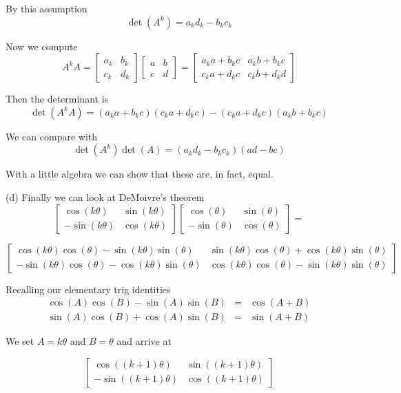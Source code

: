 \documentclass[16 pt]{amsart}
\theoremstyle{definition}
\theoremstyle{remark}
\numberwithin{equation}{subsection}
\begin{document}
By this assumption 
\[
\det(A^k) = a_k d_k - b_k c_k 
\]

Now we compute
\[
A^k A = \begin{bmatrix}
a_k & b_k \\ c_k & d_k
\end{bmatrix}
\begin{bmatrix}
a & b \\ c & d
\end{bmatrix} = 
\begin{bmatrix}
a_k a + b_k c & a_k b + b_k c \\ c_k a + d_k c & c_k  b + d_k d
\end{bmatrix}
\]


Then the determinant is
\[
\det(A^k A) = (a_k a + b_kc)(c_k a + d_k c) - (c_k a + d_k c)(a_k b + b_k c)
\]

We can compare with
\[
\det(A^k)\det(A) = (a_k d_k - b_k c_k)(ad -bc)
\]


With a little algebra we can show that these are, in fact, equal.

\vspace{.25in}

(d) Finally we can look at DeMoivre's theorem
\[
\begin{bmatrix}
\cos(k\theta) & \sin(k\theta) \\ -\sin(k\theta) & \cos(k\theta)
\end{bmatrix}
\begin{bmatrix}
\cos(\theta) & \sin(\theta) \\ -\sin(\theta) & \cos(\theta)
\end{bmatrix} = 
\]

\[
\begin{bmatrix}
\cos(k\theta)\cos(\theta) -\sin(k\theta)\sin(\theta)& \sin(k\theta)\cos(\theta) + \cos(k\theta)\sin(\theta)\\ -\sin(k\theta)\cos(\theta) - \cos(k\theta)\sin(\theta) & 
\cos(k\theta)\cos(\theta) - \sin(k\theta)\sin(\theta)
\end{bmatrix} 
\]

Recalling our elementary trig identities
\begin{eqnarray*}
\cos(A)\cos(B) - \sin(A)\sin(B) &=& \cos(A+B)\\
\sin(A)\cos(B) + \cos(A)\sin(B) &=& \sin(A+B)
\end{eqnarray*}

We set $A = k\theta$ and $B=\theta$ and arrive at

\[
\begin{bmatrix}
\cos((k+1)\theta) & \sin((k+1)\theta) \\ -\sin((k+1)\theta) & \cos((k+1)\theta)
\end{bmatrix}
\]
\end{document}
